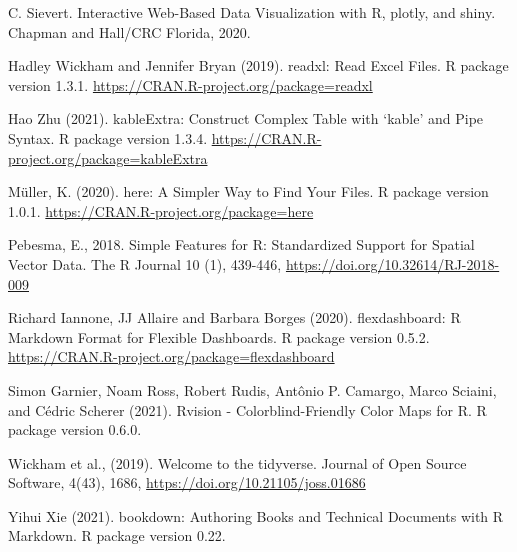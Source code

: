\documentclass[11pt,a4paper,]{article}
\begin{document}
C. Sievert. Interactive Web-Based Data Visualization with R, plotly, and shiny. Chapman and Hall/CRC Florida, 2020.

Hadley Wickham and Jennifer Bryan (2019). readxl: Read Excel Files. R package version 1.3.1. \url{https://CRAN.R-project.org/package=readxl}

Hao Zhu (2021). kableExtra: Construct Complex Table with `kable' and Pipe Syntax. R package version 1.3.4. \url{https://CRAN.R-project.org/package=kableExtra}

Müller, K. (2020). here: A Simpler Way to Find Your Files. R package version 1.0.1. \url{https://CRAN.R-project.org/package=here}

Pebesma, E., 2018. Simple Features for R: Standardized Support for Spatial Vector Data. The R Journal 10 (1), 439-446, \url{https://doi.org/10.32614/RJ-2018-009}

Richard Iannone, JJ Allaire and Barbara Borges (2020). flexdashboard: R Markdown Format for Flexible Dashboards. R package version 0.5.2. \url{https://CRAN.R-project.org/package=flexdashboard}

Simon Garnier, Noam Ross, Robert Rudis, Antônio P. Camargo, Marco Sciaini, and Cédric Scherer (2021). Rvision - Colorblind-Friendly Color Maps for R. R package version 0.6.0.

Wickham et al., (2019). Welcome to the tidyverse. Journal of Open Source Software, 4(43), 1686, \url{https://doi.org/10.21105/joss.01686}

Yihui Xie (2021). bookdown: Authoring Books and Technical Documents with R Markdown. R package version 0.22.

\printbibliography
\end{document}
